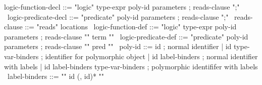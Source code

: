 \begin{syntax}
  logic-function-decl ::= "logic" type-expr poly-id parameters ;
                          reads-clause ";"
  \
  logic-predicate-decl ::= "predicate" poly-id parameters ;
                          reads-clause ";"
  \
  reads-clause ::= "reads" locations
  \
  logic-function-def ::= "logic" type-expr poly-id parameters ;
                   {reads-clause} "{" term "}"
  \
  logic-predicate-def ::= "predicate" poly-id parameters ;
                          {reads-clause} "{" pred "}"
  \
  poly-id ::= id ; normal identifier
  | id type-var-binders ; identifier for polymorphic object
  | id {label-binders} ; normal identifier with labels
  | id {label-binders} type-var-binders ; polymorphic identififer with labels
  \
  label-binders ::= {"{" id (, id)* "}"}
\end{syntax}